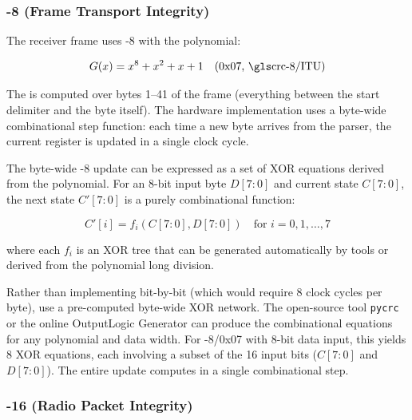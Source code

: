 \documentclass[11pt,letterpaper]{article}
\begin{document}
	\subsubsection{\CRC{}-8 (Frame Transport Integrity)}

	The receiver frame uses \CRC{}-8 with the polynomial:

	\begin{equation}
		G(x) = x^8 + x^2 + x + 1 \quad \text{(0x07, \CRC{}-8/ITU)}
		\label{eq:crc8}
	\end{equation}

	The \CRC{} is computed over bytes 1--41 of the frame (everything between the start delimiter and the \CRC{} byte itself). The hardware implementation uses a byte-wide combinational \CRC{} step function: each time a new byte arrives from the parser, the current \CRC{} register is updated in a single clock cycle.

	The byte-wide \CRC{}-8 update can be expressed as a set of XOR equations derived from the polynomial. For an 8-bit input byte $D[7{:}0]$ and current \CRC{} state $C[7{:}0]$, the next \CRC{} state $C'[7{:}0]$ is a purely combinational function:

	\begin{equation}
		C'[i] = f_i(C[7{:}0], D[7{:}0]) \quad \text{for } i = 0, 1, \ldots, 7
		\label{eq:crc8_update}
	\end{equation}

	where each $f_i$ is an XOR tree that can be generated automatically by tools or derived from the polynomial long division.

	\begin{tcolorbox}[infobox={Implementation Strategy: \CRC{} XOR Equations}]
		Rather than implementing \CRC{} bit-by-bit (which would require 8 clock cycles per byte), use a pre-computed byte-wide XOR network. The open-source tool \texttt{pycrc} or the online OutputLogic \CRC{} Generator can produce the \VHDL{} combinational equations for any polynomial and data width. For \CRC{}-8/0x07 with 8-bit data input, this yields 8 XOR equations, each involving a subset of the 16 input bits ($C[7{:}0]$ and $D[7{:}0]$). The entire update computes in a single combinational step.
	\end{tcolorbox}

	\subsubsection{\CRC{}-16 (Radio Packet Integrity)}
\end{document}
